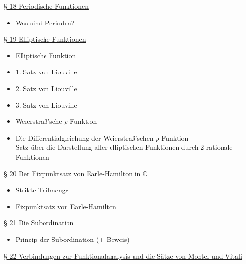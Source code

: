 \documentclass[11pt]{article}
\newcommand{\C}{\mathbb{C}}
\begin{document}
\underline{§ 18 Periodische Funktionen}
\vspace{-0.5cm}
\begin{itemize}
\item Was sind Perioden?
\end{itemize}

\underline{§ 19 Elliptische Funktionen}
\vspace{-0.5cm}
\begin{itemize}
\item Elliptische Funktion
\item 1. Satz von Liouville
\item 2. Satz von Liouville
\item 3. Satz von Liouville
\item Weierstraß'sche $\rho$-Funktion
\item Die Differentialgleichung der Weierstraß’schen $\rho$-Funktion \\
Satz über die Darstellung aller elliptischen Funktionen durch 2 rationale Funktionen
\end{itemize}

\underline{§ 20 Der Fixpunktsatz von Earle-Hamilton in $\C$}
\vspace{-0.5cm}
\begin{itemize}
\item Strikte Teilmenge
\item Fixpunktsatz von Earle-Hamilton
\end{itemize}

\underline{§ 21 Die Subordination}
\vspace{-0.5cm}
\begin{itemize}
\item Prinzip der Subordination (+ Beweis)
\end{itemize}

\underline{§ 22 Verbindungen zur Funktionalanalysis und die Sätze von Montel und Vitali}
\end{document}

